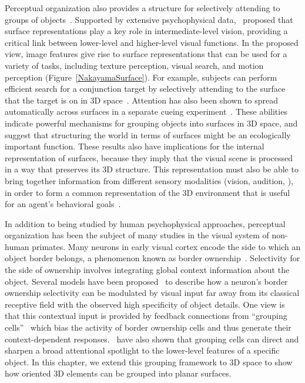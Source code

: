 Perceptual organization also provides a structure for selectively attending to groups of objects~\citep{Treisman_Gelade80}. Supported by extensive psychophysical data,~\citet{Nakayama_etal95} proposed that surface representations play a key role in intermediate-level vision, 
%
providing a critical link
between lower-level and higher-level visual functions.
In the proposed view, image features give rise to surface representations that can be used for a variety of tasks, including texture perception, visual search, and motion perception (Figure~\ref{NakayamaSurface}).
%
For example, subjects can perform efficient search for a conjunction target by selectively attending to the surface that the target is on in 3D space~\citep{Nakayama_Silverman86}. Attention has also been shown to spread automatically across surfaces in a separate cueing experiment~\citep{He_Nakayama95}. These abilities indicate powerful mechanisms for grouping objects into surfaces in 3D space, and suggest that structuring the world in terms of surfaces might be an ecologically important function. These results also have implications for the internal representation of surfaces, because they imply that the visual scene is processed in a way that preserves its 3D
structure. This representation must also be able to bring together
information from different sensory modalities (\eg vision, audition,
\etc), in order to form a common representation of the 3D environment
that is useful for an agent's behavioral goals~\citep{Lewicki_etal14}.

In addition to being studied by human psychophysical approaches, perceptual organization has been the subject of many studies in the visual system of non-human primates. Many neurons in early visual cortex encode the side to which an object border belongs, a phenomenon known as border ownership~\citep{Zhou_etal00}. Selectivity for the side of ownership involves integrating global context information about the object. Several models have been proposed~\citep{Zhaoping05, Craft_etal07} to describe how a neuron's border ownership selectivity can be modulated by visual input far away from its classical receptive field with the observed high specificity of object details. One view is that this contextual input is provided by feedback connections from ``grouping cells''~\citep{Craft_etal07} which bias the activity of border ownership cells and thus generate their context-dependent responses.~\citet{Mihalas_etal11b} have also shown that
grouping cells can direct and sharpen a broad attentional spotlight to the lower-level features of a specific object. In this chapter, we extend this grouping framework to 3D space to show how oriented 3D elements can be grouped into planar surfaces.


